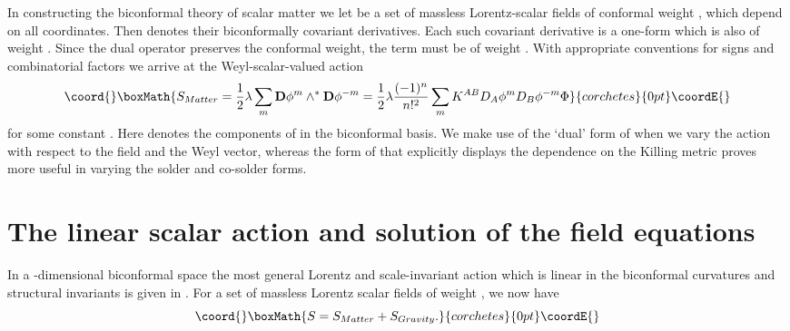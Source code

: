 \documentclass[a4paper,a4paper]{article}
\begin{document}
In constructing the biconformal theory of scalar matter we let \coordHE{}
be a set of massless Lorentz-scalar fields of conformal weight \coordHE{} \cite{Extended conformal paper}, which depend on all \coordHE{} coordinates.
Then \coordHE{} denotes their biconformally covariant
derivatives. Each such covariant derivative is a one-form which is also of
weight \coordHE{}. Since the dual operator preserves the conformal weight, the term 
\coordHE{} must be of weight \coordHE{}. With appropriate
conventions for signs and combinatorial factors we arrive at the
Weyl-scalar-valued action 
\[\coord{}\boxMath{
S_{Matter}=\frac{1}{2}\lambda \sum_{m}\mathbf{D}\phi ^{m}\wedge ^{\ast }%
\mathbf{D}\phi ^{-m}=\frac{1}{2}\lambda \frac{(-1)^{n}}{n!^{2}}%
\sum_{m}K^{AB}D_{A}\phi ^{m}D_{B}\phi ^{-m}{\Phi } 
}{corchetes}{0pt}\coordE{}\]
for some constant \myHighlight{$\lambda $}\coordHE{}. Here \coordHE{} denotes the components
of \coordHE{} in the biconformal basis. We make use of the `dual'
form of \coordHE{} when we vary the action with respect to the field and
the Weyl vector, whereas the form of \coordHE{} that explicitly displays
the dependence on the Killing metric proves more useful in varying the
solder and co-solder forms.

\section{The linear scalar action and solution of the field equations}

In a \coordHE{}-dimensional biconformal space the most general Lorentz and
scale-invariant action \coordHE{} which is linear in the biconformal
curvatures and structural invariants is given in \cite{WW}. For a set of
massless Lorentz scalar fields \coordHE{} of weight \coordHE{}, we now have 
\[\coord{}\boxMath{
S=S_{Matter}+S_{Gravity}. 
}{corchetes}{0pt}\coordE{}\]
\end{document}
